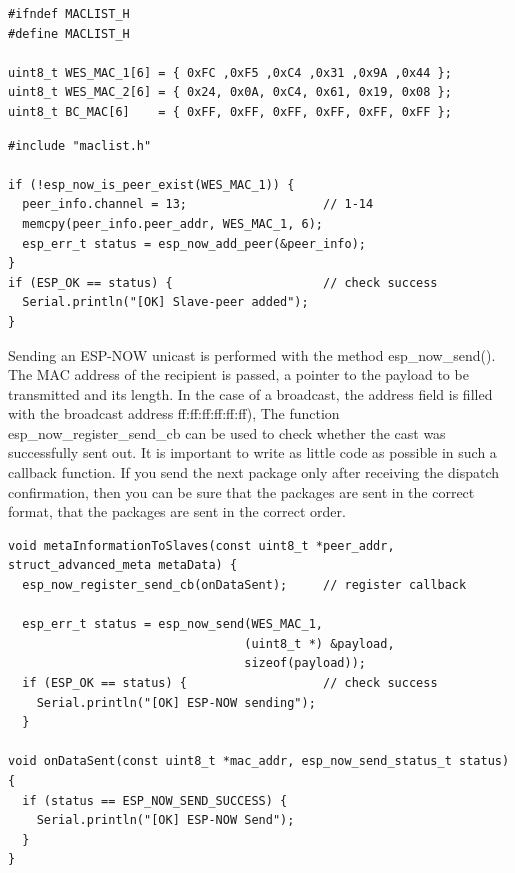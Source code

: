 \begin{lstlisting}
#ifndef MACLIST_H
#define MACLIST_H

uint8_t WES_MAC_1[6] = { 0xFC ,0xF5 ,0xC4 ,0x31 ,0x9A ,0x44 };
uint8_t WES_MAC_2[6] = { 0x24, 0x0A, 0xC4, 0x61, 0x19, 0x08 };
uint8_t BC_MAC[6]    = { 0xFF, 0xFF, 0xFF, 0xFF, 0xFF, 0xFF };
\end{lstlisting}
\label{lst:macaddress}

\begin{lstlisting}[caption=Add Peers]
#include "maclist.h"

if (!esp_now_is_peer_exist(WES_MAC_1)) {
  peer_info.channel = 13;                   // 1-14
  memcpy(peer_info.peer_addr, WES_MAC_1, 6);
  esp_err_t status = esp_now_add_peer(&peer_info);
}
if (ESP_OK == status) {                     // check success
  Serial.println("[OK] Slave-peer added"); 
}
\end{lstlisting}

Sending an ESP-NOW unicast is performed with the method esp\_now\_send().
The MAC address of the recipient is passed, a pointer to the payload to be transmitted and its length.
In the case of a broadcast, the address field is filled with the broadcast address ff:ff:ff:ff:ff:ff),
The function esp\_now\_register\_send\_cb can be used to check whether the cast was successfully sent out.
It is important to write as little code as possible in such a callback function.
If you send the next package only after receiving the dispatch confirmation, then you can be sure that the packages are sent in the correct format,
that the packages are sent in the correct order.

\begin{lstlisting}[caption=Send ESP-NOW Cast UC/BC]
void metaInformationToSlaves(const uint8_t *peer_addr, struct_advanced_meta metaData) {
  esp_now_register_send_cb(onDataSent);     // register callback

  esp_err_t status = esp_now_send(WES_MAC_1,
                                 (uint8_t *) &payload,
                                 sizeof(payload));
  if (ESP_OK == status) {                   // check success
    Serial.println("[OK] ESP-NOW sending"); 
  }

void onDataSent(const uint8_t *mac_addr, esp_now_send_status_t status) {
  if (status == ESP_NOW_SEND_SUCCESS) {
    Serial.println("[OK] ESP-NOW Send"); 
  }
}
\end{lstlisting}
\label{lst:sendcast}

